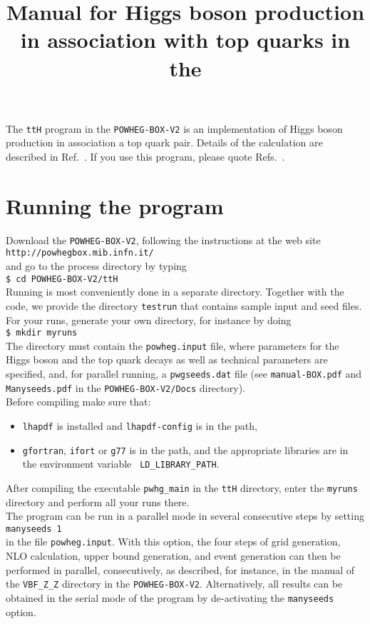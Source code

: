 \documentclass[a4paper,11pt]{article}
\title{Manual for  Higgs boson production in association with top quarks in the \POWHEGBOXV{}}
\date{}
\newcommand\POWHEGBOXV{{\tt POWHEG-BOX-V2}}
\begin{document}
\maketitle
%
\noindent
The {\tt ttH} program in the \POWHEGBOXV{} is an implementation of Higgs boson production in association a top quark pair. Details of the calculation are described in Ref.~\cite{HJRW}. If you use this program, please quote Refs.~\cite{HJRW,DORW,DJORW,Alioli:2010xd}.
%
\section*{Running the program}
%
Download the \POWHEGBOXV{}, following the instructions at the web site 
\\[2ex]
{\tt http://powhegbox.mib.infn.it/}
\\[2ex] 
and go to the process directory by typing 
\\[2ex]
{\tt \$ cd \POWHEGBOXV/ttH}  
\\[2ex]
Running is most conveniently done in a separate directory. Together with the code, we provide the directory {\tt testrun} that contains sample input and seed files. 
\\[2ex]
For your runs, generate your own directory, for instance by doing 
\\[2ex]
{\tt \$ mkdir myruns}
\\[2ex]
The directory must contain the {\tt powheg.input} file, where parameters for the Higgs boson and the top quark decays as well as technical  parameters are specified, and, for
parallel running, a {\tt pwgseeds.dat} file (see {\tt manual-BOX.pdf}
and {\tt Manyseeds.pdf} in the  {\tt POWHEG-BOX-V2/Docs} directory).
\\[2ex]
Before compiling make sure that:
\begin{itemize}
\item 
{\tt lhapdf} is installed and {\tt lhapdf-config} is in the path,
\item
{\tt gfortran}, {\tt ifort} or {\tt g77} is in the path, and the
appropriate libraries are in the environment variable {\tt
  LD\_LIBRARY\_PATH}. 
\end{itemize}
After compiling the executable {\tt pwhg\_main} in the {\tt ttH} directory, enter the {\tt myruns} directory and perform all your runs there. 
\\[2ex]
The program can be run in a parallel mode in several consecutive steps by setting 
\\[2ex]
{\tt manyseeds   1}
\\[2ex]
in the file  {\tt powheg.input}.  With this option, the four steps of grid generation, NLO calculation, upper bound generation, and event generation can then be performed in parallel, consecutively, as described, for instance, in the manual of the {\tt VBF\_Z\_Z} directory in the \POWHEGBOXV{}. Alternatively, all results can be obtained in the serial mode of the program by de-activating the  {\tt manyseeds} option. 
\end{document}
